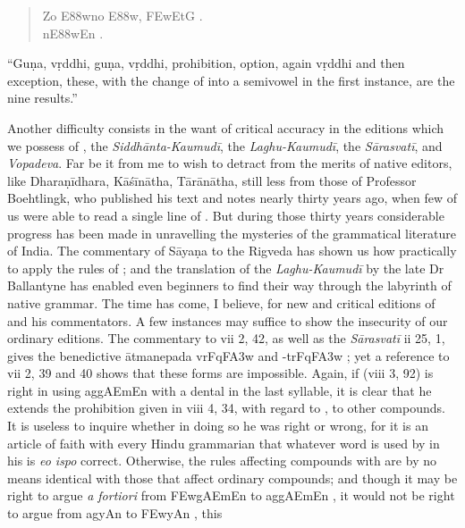 \begin{quote}
  {\dn {}Zo E\388wno E\388w, \3FEwEtG\? .} \\
  {\dn {}n\0E\388wEn\0 .}
\end{quote}

``Guṇa, vṛddhi, guṇa, vṛddhi, prohibition, option, again vṛddhi and then
exception, these, with the change of  into a semivowel in the
first instance, are the nine results.''

Another difficulty consists in the want of critical accuracy in the
editions which we possess of \panini{}, the \emph{Siddhānta-Kaumudī},
the \emph{Laghu-Kaumudī}, the \emph{Sārasvatī}, and \emph{Vopadeva}. Far
be it from me to wish to detract from the merits of native editors, like
Dharaṇīdhara, Kāśīnātha, Tārānātha, still less from those of Professor
Boehtlingk, who published his text and notes nearly thirty years ago,
when few of us were able to read a single line of \panini{}. But during
those thirty years considerable progress has been made in unravelling
the mysteries of the grammatical literature of India. The commentary of
Sāyaṇa to the Rigveda has shown us how practically to apply the rules of
\panini{}; and the translation of the \emph{Laghu-Kaumudī} by the late
Dr Ballantyne has enabled even beginners to find their way through the
labyrinth of native grammar. The time has come, I believe, for new and
critical editions of \panini{} and his commentators. A few instances may
suffice to show the insecurity of our ordinary editions. The commentary
to \panini{} vii 2, 42, as well as the \emph{Sārasvatī} ii 25, 1, gives
the benedictive ātmanepada {\dn vrFqF\3A3w}  and
{\dn -trFqF\3A3w} ; yet a reference to \panini{} vii 2,
39 and 40 shows that these forms are impossible. Again, if \panini{}
(viii 3, 92) is right in using {\dn ag\5gAEmEn}  with a
dental  in the last syllable, it is clear that he extends the
prohibition given in viii 4, 34, with regard to , to other
compounds. It is useless to inquire whether in doing so he was right or
wrong, for it is an article of faith with every Hindu grammarian that
whatever word is used by \panini{} in his  is \emph{eo ispo}
correct. Otherwise, the rules affecting compounds with 
are by no means identical with those that affect ordinary compounds; and
though it may be right to argue \emph{a fortiori} from {\dn \3FEwgAEmEn}
 to {\dn ag\5gAEmEn} , it would not be right
to argue from {\dn ag\5yAn}  to {\dn \3FEwyAn} , this
